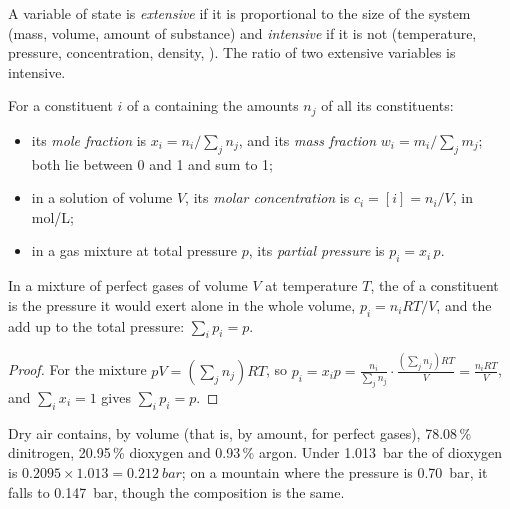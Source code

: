 \begin{definition}\label{def:b1:extent-q-and-k:variables}
A variable of state is \emph{extensive} if it
is proportional to the size of the system (mass, volume, amount of
substance) and \emph{intensive} if it is not
(temperature, pressure, concentration, density, ). The ratio
of two extensive variables is intensive.
\end{definition}

\begin{definition}\label{def:b1:extent-q-and-k:composition}
For a constituent $i$ of a  containing the amounts $n_j$ of all its
constituents:
\begin{itemize}
  \item its \emph{mole fraction} is $x_i = n_i/\sum_j
        n_j$, and its \emph{mass fraction} $w_i =
        m_i/\sum_j m_j$; both lie between 0 and 1 and sum to 1;
  \item in a solution of volume $V$, its \emph{molar
        concentration} is $c_i = [i] = n_i/V$,
        in \unit{mol/L};
  \item in a gas mixture at total pressure $p$, its \emph{partial
        pressure} is $p_i = x_i\,p$.
\end{itemize}
\end{definition}

\begin{proposition}\label{prop:b1:extent-q-and-k:dalton}
In a mixture of perfect gases of volume $V$ at temperature $T$, the
 of a constituent is the pressure it would exert alone in
the whole volume, $p_i = n_iRT/V$, and the  add up to the
total pressure: $\sum_i p_i = p$.
\end{proposition}

\begin{proof}
For the mixture $pV = (\sum_j n_j)RT$, so $p_i = x_i p = \frac{n_i}{\sum_j
n_j}\cdot\frac{(\sum_j n_j)RT}{V} = \frac{n_iRT}{V}$, and $\sum_i x_i = 1$
gives $\sum_i p_i = p$.
\end{proof}

\begin{example}[Air]\label{ex:b1:extent-q-and-k:air}
Dry air contains, by volume (that is, by amount, for perfect gases),
78.08\,\% dinitrogen, 20.95\,\% dioxygen and 0.93\,\% argon. Under
\qty{1.013}{bar} the  of dioxygen is $0.2095 \times
1.013 = \qty{0.212}{bar}$; on a mountain where the pressure is
\qty{0.70}{bar}, it falls to \qty{0.147}{bar}, though the composition is
the same.
\end{example}

